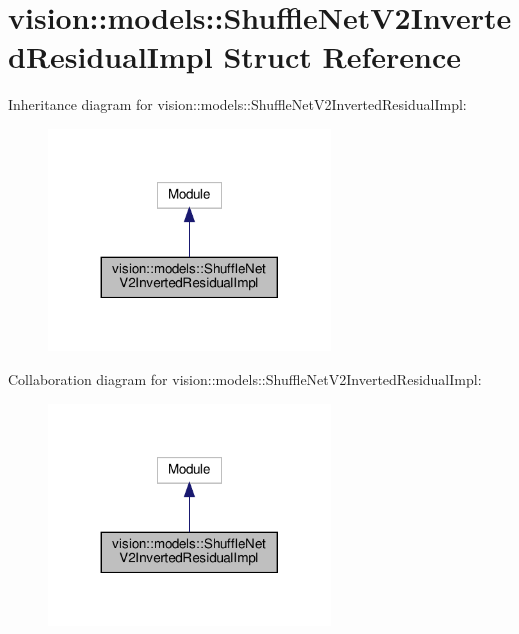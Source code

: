 \hypertarget{structvision_1_1models_1_1ShuffleNetV2InvertedResidualImpl}{}\section{vision\+:\+:models\+:\+:Shuffle\+Net\+V2\+Inverted\+Residual\+Impl Struct Reference}
\label{structvision_1_1models_1_1ShuffleNetV2InvertedResidualImpl}


Inheritance diagram for vision\+:\+:models\+:\+:Shuffle\+Net\+V2\+Inverted\+Residual\+Impl\+:
\nopagebreak
\begin{figure}[H]
\begin{center}
\leavevmode
\includegraphics[width=212pt]{structvision_1_1models_1_1ShuffleNetV2InvertedResidualImpl__inherit__graph}
\end{center}
\end{figure}


Collaboration diagram for vision\+:\+:models\+:\+:Shuffle\+Net\+V2\+Inverted\+Residual\+Impl\+:
\nopagebreak
\begin{figure}[H]
\begin{center}
\leavevmode
\includegraphics[width=212pt]{structvision_1_1models_1_1ShuffleNetV2InvertedResidualImpl__coll__graph}
\end{center}
\end{figure}
